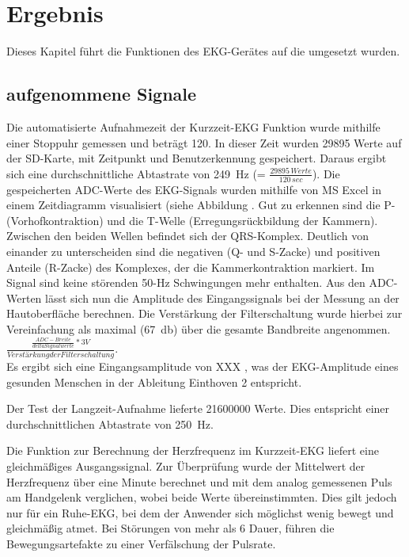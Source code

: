 
\section{Ergebnis}

Dieses Kapitel führt die Funktionen des EKG-Gerätes auf die umgesetzt wurden. 

\subsection{aufgenommene Signale}

Die automatisierte Aufnahmezeit der Kurzzeit-EKG Funktion wurde mithilfe einer Stoppuhr gemessen und beträgt \SI{120}{\sec}. In dieser Zeit wurden 29895 Werte auf der SD-Karte, mit Zeitpunkt und Benutzerkennung gespeichert. Daraus ergibt sich eine durchschnittliche Abtastrate von \SI{249}{\hertz} (= $ \frac{29895\,Werte}{120\,sec}$). Die gespeicherten ADC-Werte des EKG-Signals wurden mithilfe von MS Excel in einem Zeitdiagramm visualisiert (siehe Abbildung 
. Gut zu erkennen sind die P- (Vorhofkontraktion) und die T-Welle (Erregungsrückbildung der Kammern). Zwischen den beiden Wellen befindet sich der QRS-Komplex. Deutlich von einander zu unterscheiden sind die negativen (Q- und S-Zacke) und positiven Anteile (R-Zacke) des Komplexes, der die Kammerkontraktion markiert. Im Signal sind keine störenden 50-Hz Schwingungen mehr enthalten. Aus den ADC-Werten lässt sich nun die Amplitude des Eingangssignals bei der Messung an der Hautoberfläche berechnen. Die Verstärkung der Filterschaltung wurde hierbei zur Vereinfachung als maximal (\SI{67}{\decibel}) über die gesamte Bandbreite angenommen. 
\\
$  \frac{\frac{ADC-Breite}{delta Signalwerte} * 3V}{Verstärkung der Filterschaltung} $. 
\\
Es ergibt sich eine Eingangsamplitude von XXX
, was der EKG-Amplitude eines gesunden Menschen in der Ableitung Einthoven 2 entspricht.

Der Test der Langzeit-Aufnahme lieferte 21600000 Werte. Dies entspricht einer durchschnittlichen Abtastrate von \SI{250}{\hertz}. 

Die Funktion zur Berechnung der Herzfrequenz im Kurzzeit-EKG liefert eine gleichmäßiges Ausgangssignal. Zur Überprüfung wurde der Mittelwert der Herzfrequenz über eine Minute berechnet und mit dem analog gemessenen Puls am Handgelenk verglichen, wobei beide Werte übereinstimmten. Dies gilt jedoch nur für ein Ruhe-EKG, bei dem der Anwender sich möglichst wenig bewegt und gleichmäßig atmet. Bei Störungen von mehr als \SI{6}{\sec} Dauer, führen die Bewegungsartefakte zu einer Verfälschung der Pulsrate. 

